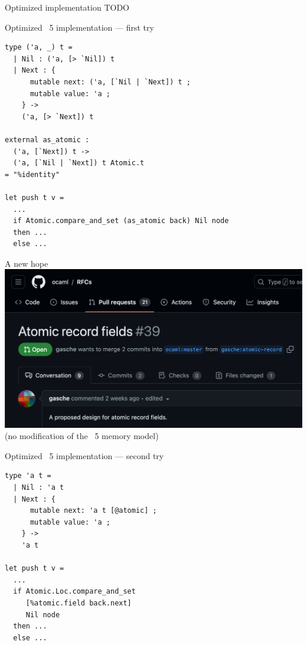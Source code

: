 
\begin{frame}{Optimized implementation}
TODO
\end{frame}


\begin{frame}[fragile]{Optimized \OCaml~5 implementation --- first try}
\small
\begin{verbatim}
type ('a, _) t =
  | Nil : ('a, [> `Nil]) t
  | Next : {
      mutable next: ('a, [`Nil | `Next]) t ;
      mutable value: 'a ;
    } -> 
    ('a, [> `Next]) t

external as_atomic :
  ('a, [`Next]) t ->
  ('a, [`Nil | `Next]) t Atomic.t
= "%identity"

let push t v =
  ...
  if Atomic.compare_and_set (as_atomic back) Nil node
  then ...
  else ...
\end{verbatim}
\end{frame}


\begin{frame}{A new hope}
\centering
\includegraphics[scale=0.35]{images/rfc.png}
\vfill
(no modification of the \OCaml~5 memory model)
\end{frame}


\begin{frame}[fragile]{Optimized \OCaml~5 implementation --- second try}
\begin{verbatim}
type 'a t =
  | Nil : 'a t
  | Next : {
      mutable next: 'a t [@atomic] ;
      mutable value: 'a ;
    } -> 
    'a t

let push t v =
  ...
  if Atomic.Loc.compare_and_set
     [%atomic.field back.next]
     Nil node
  then ...
  else ...
\end{verbatim}
\end{frame}

